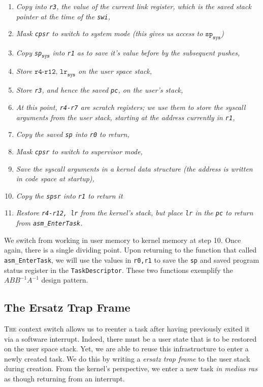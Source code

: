 \documentclass{amsart}
\begin{document}
\begin{enumerate}
	\item \textit{Copy into \texttt{r3}, the value of the current link register,
		which is the saved stack pointer at the time of the \texttt{swi},}
	\item \textit{Mask \texttt{cpsr} to switch to system mode (this gives us
		access to $\texttt{sp}_\texttt{sys}$)}
	\item \textit{Copy \texttt{sp}$_\texttt{sys}$ into \texttt{r1} as to save
		it's value before by the subsequent pushes,}
	\item \textit{Store $\texttt{r4-r12, lr}_\texttt{sys}$ on the user space
		stack,}
	\item \textit{Store \texttt{r3}, and hence the saved \texttt{pc}, on the
		user's stack,}
	\item \textit{At this point, \texttt{r4-r7} are scratch registers; we use
		them to store the syscall arguments from the user stack, starting at the
		address currently in \texttt{r1},}
	\item \textit{Copy the saved \texttt{sp} into \texttt{r0} to return,}
	\item \textit{Mask \texttt{cpsr} to switch to supervisor mode,}
	\item \textit{Save the syscall arguments in a kernel data structure (the
		address is written in code space at startup),}
	\item \textit{Copy the \texttt{spsr} into \texttt{r1} to return it}
	\item \textit{Restore \texttt{r4-r12, lr} from the kernel's stack, but place
		\texttt{lr} in the \texttt{pc} to return from  \texttt{asm\_EnterTask}.}
\end{enumerate}

We switch from working in user memory to kernel memory at step 10. Once again,
there is a single dividing point. Upon returning to the function that called
\texttt{asm\_EnterTask}, we will use the values in \texttt{r0,r1} to save the
\texttt{sp} and saved program status register in the \texttt{TaskDescriptor}.
These two functions exemplify the $ABB^{-1}A^{-1}$ design pattern.

\subsection*{The Ersatz Trap Frame}

\textsc{The} context switch allows us to reenter a task after having previously exited it
via a software interrupt. Indeed, there must be a user state that is to be
restored on the user space stack. Yet, we are able to reuse this infrastructure
to enter a newly created task. We do this by writing a \textit{ersatz trap
frame} to the user stack during creation. From the kernel's perspective, we
enter a new task \textit{in medias ras} as though returning from an interrupt.
\end{document}
